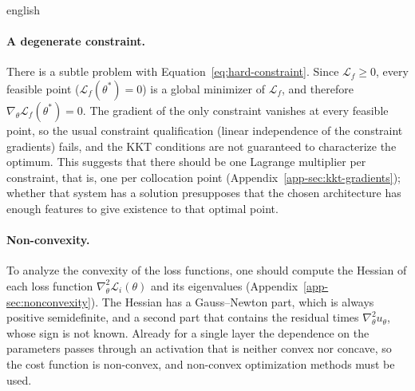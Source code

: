 \documentclass[12pt,letterpaper,twoside]{book}
\newcommand{\Loss}{\mathcal{L}}
\newif\ifreviewmode
\newcommand{\revtag}[2]{\ifreviewmode{\color{red!70!black}\textsf{\footnotesize[#1#2]}}\fi}
\newcommand{\verificar}[1]{\revtag{VERIFICAR}{: #1}}
\begin{document}
\begin{hyphenrules}{english}
\paragraph{A degenerate constraint.}
There is a subtle problem with Equation~\eqref{eq:hard-constraint}. Since $\Loss_f\ge0$, every feasible point
($\Loss_f(\theta^{*})=0$) is a global minimizer of $\Loss_f$, and therefore $\nabla_\theta\Loss_f(\theta^{*})=0$.
The gradient of the only constraint vanishes at every feasible point, so the usual constraint
qualification (linear independence of the constraint gradients) fails, and the KKT conditions are not
guaranteed to characterize the optimum.\verificar{add a reference on constraint qualifications, e.g.\
Nocedal \& Wright} This suggests that there should be one Lagrange multiplier per constraint, that is,
one per collocation point (Appendix~\ref{app-sec:kkt-gradients}); whether that system has a solution
presupposes that the chosen architecture has enough features to give existence to that optimal point.

\paragraph{Non-convexity.}
To analyze the convexity of the loss functions, one should compute the Hessian of each loss function
$\nabla^2_\theta\Loss_i(\theta)$ and its eigenvalues (Appendix~\ref{app-sec:nonconvexity}). The Hessian has
a Gauss--Newton part, which is always positive semidefinite, and a second part that contains the
residual times $\nabla^2_\theta u_\theta$, whose sign is not known. Already for a single layer the
dependence on the parameters passes through an activation that is neither convex nor concave, so the
cost function is non-convex, and non-convex optimization methods must be used.


\end{hyphenrules}
\end{document}

